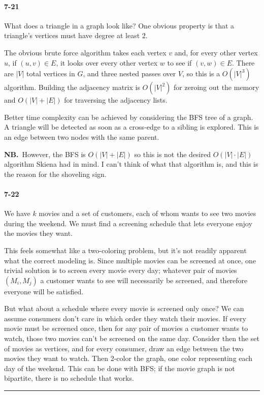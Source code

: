 \documentclass{report}
\newcommand{\underconstruction}{\marginpar{\bcpanchant}}
\newcommand{\okthen}{\rule[-1.4pt]{0.3em}{0.77em}}
\newcommand{\notabene}{{\bf NB.}\ } %
\begin{document}
\paragraph{7-21} What does a triangle in a graph look like? One obvious property is that a triangle's vertices must have degree at least 2.

The obvious brute force algorithm takes each vertex $v$ and, for every other vertex $u$, if $(u,v)\in E$, it looks over every other vertex $w$ to see if $(v,w)\in E$. There are $|V|$ total vertices in $G$, and three nested passes over $V$, so this is a $O(|V|^3)$ algorithm. Building the adjacency matrix is $O(|V|^2)$ for zeroing out the memory and $O(|V|+|E|)$ for traversing the adjacency lists.

Better time complexity can be achieved by considering the BFS tree of a graph. A triangle will be detected as soon as a cross-edge to a sibling is explored. This is an edge between two nodes with the same parent.

\smallskip

\notabene However, the BFS is $O(|V|+|E|)$ so this is not the desired $O(|V|\cdot|E|)$ algorithm Skiena had in mind. I can't think of what that algorithm is, and this is the reason for the shoveling sign.\underconstruction

\paragraph{7-22} We have $k$ movies and a set of customers, each of whom wants to see two movies during the weekend. We must find a screening schedule that lets everyone enjoy the movies they want.

This feels somewhat like a two-coloring problem, but it's not readily apparent what the correct modeling is. Since multiple movies can be screened at once, one trivial solution is to screen every movie every day; whatever pair of movies $(M_i,M_j)$ a customer wants to see will necessarily be screened, and therefore everyone will be satisfied.

But what about a schedule where every movie is screened only once? We can assume consumers don't care in which order they watch their movies. If every movie must be screened once, then for any pair of movies a customer wants to watch, those two movies can't be screened on the same day. Consider then the set of movies as vertices, and for every consumer, draw an edge between the two movies they want to watch. Then 2-color the graph, one color representing each day of the weekend. This can be done with BFS; if the movie graph is not bipartite, there is no schedule that works.\ \okthen
\end{document}
